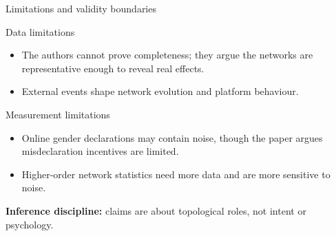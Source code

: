 \begin{frame}{Limitations and validity boundaries}
  \small
  \begin{block}{Data limitations}
    \begin{itemize}
      \item The authors cannot prove completeness; they argue the networks are representative enough to reveal real effects.
      \item External events shape network evolution and platform behaviour.
    \end{itemize}
  \end{block}

  \begin{block}{Measurement limitations}
    \begin{itemize}
      \item Online gender declarations may contain noise, though the paper argues misdeclaration incentives are limited.
      \item Higher-order network statistics need more data and are more sensitive to noise.
    \end{itemize}
  \end{block}

  {\footnotesize\color{PresTwoSecondary}\textbf{Inference discipline:}
  claims are about \alert{topological roles}, not intent or psychology.}

\end{frame}

